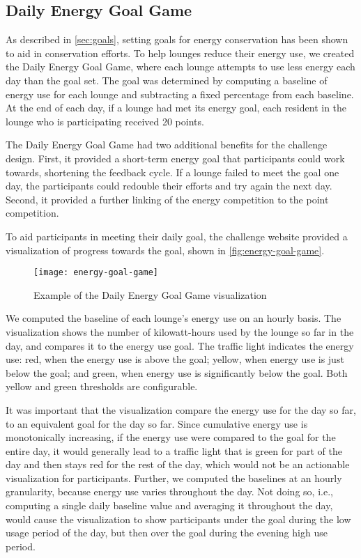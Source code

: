 \subsection{Daily Energy Goal Game}
\label{sec:energy-goal-game}

As described in \autoref{sec:goals}, setting goals for energy conservation has been shown to aid in conservation efforts. To help lounges reduce their energy use, we created the Daily Energy Goal Game, where each lounge attempts to use less energy each day than the goal set. The goal was determined by computing a baseline of energy use for each lounge and subtracting a fixed percentage from each baseline. At the end of each day, if a lounge had met its energy goal, each resident in the lounge who is participating received 20 points.

The Daily Energy Goal Game had two additional benefits for the challenge design. First, it provided a short-term energy goal that participants could work towards, shortening the feedback cycle. If a lounge failed to meet the goal one day, the participants could redouble their efforts and try again the next day. Second, it provided a further linking of the energy competition to the point competition.

To aid participants in meeting their daily goal, the challenge website provided a visualization of progress towards the goal, shown in \autoref{fig:energy-goal-game}.

\begin{figure}[htbp]
	\centering
		\texttt{[image: energy-goal-game]}
		\caption{Example of the Daily Energy Goal Game visualization}
\label{fig:energy-goal-game}
\end{figure}

We computed the baseline of each lounge's energy use on an hourly basis. The visualization shows the number of kilowatt-hours used by the lounge so far in the day, and compares it to the energy use goal. The traffic light indicates the energy use: red, when the energy use is above the goal; yellow, when energy use is just below the goal; and green, when energy use is significantly below the goal. Both yellow and green thresholds are configurable.

It was important that the visualization compare the energy use for the day so far, to an equivalent goal for the day so far. Since cumulative energy use is monotonically increasing, if the energy use were compared to the goal for the entire day, it would generally lead to a traffic light that is green for part of the day and then stays red for the rest of the day, which would not be an actionable visualization for participants. Further, we computed the baselines at an hourly granularity, because energy use varies throughout the day. Not doing so, i.e., computing a single daily baseline value and averaging it throughout the day, would cause the visualization to show participants under the goal during the low usage period of the day, but then over the goal during the evening high use period.


